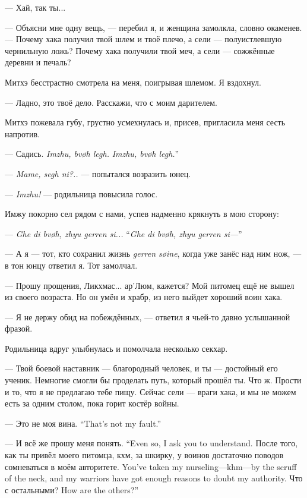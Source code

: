 --- Хай, так ты...

--- Объясни мне одну вещь, --- перебил я, и женщина замолкла, словно окаменев.
--- Почему хака получил твой шлем и твоё плечо, а сели --- полуистлевшую чернильную ложь?
Почему хака получили твой меч, а сели --- сожжённые деревни и печаль?

Митхэ бесстрастно смотрела на меня, поигрывая шлемом. Я вздохнул.

--- Ладно, это твоё дело. Расскажи, что с моим дарителем.

Митхэ пожевала губу, грустно усмехнулась и, присев, пригласила меня сесть напротив.

--- Садись.
{\textit{Imzhu, bv\o h legh.}}
{\textit{Imzhu, bv\o h legh.}''}

--- \textit{Mame, segh ni?..} --- попытался возразить юнец.

--- \textit{Imzhu!} --- родильница повысила голос.

Имжу покорно сел рядом с нами, успев надменно крякнуть в мою сторону:

{--- \textit{Ghe di bv\o{}h, zhyu gerren si...}}
{``\textit{Ghe di bv\o{}h, zhyu gerren si---}''}

--- А я --- тот, кто сохранил жизнь \textit{gerren s\o{}ine}, когда уже занёс над ним нож, --- в тон юнцу ответил я.
Тот замолчал.

--- Прошу прощения, Ликхмас... ар’Люм, кажется?
Мой питомец ещё не вышел из своего возраста.
Но он умён и храбр, из него выйдет хороший воин хака.

--- Я не держу обид на побеждённых, --- ответил я чьей-то давно услышанной фразой.

Родильница вдруг улыбнулась и помолчала несколько секхар.

--- Твой боевой наставник --- благородный человек, и ты --- достойный его ученик.
Немногие смогли бы проделать путь, который прошёл ты.
Что ж.
Прости и то, что я не предлагаю тебе пищу.
Сейчас сели --- враги хака, и мы не можем есть за одним столом, пока горит костёр войны.

{--- Это не моя вина.}
{``That's not my fault.''}

{--- И всё же прошу меня понять.}
{``Even so, I ask you to understand.}
{После того, как ты привёл моего питомца, кхм, за шкирку, у воинов достаточно поводов сомневаться в моём авторитете.}
{You've taken my nurseling---khm---by the scruff of the neck, and my warriors have got enough reasons to doubt my authority.}
{Что с остальными?}
{How are the others?''}

